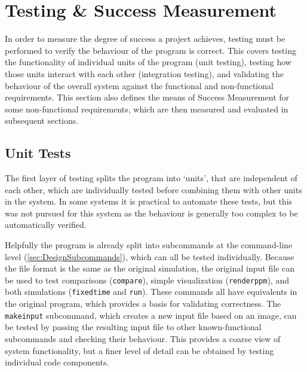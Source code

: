 \chapter{Testing \& Success Measurement}\label{sec:Testing}
In order to measure the degree of success a project achieves, testing must be performed to verify the behaviour of the program is correct.
This covers testing the functionality of individual units of the program (unit testing), testing how those units interact with each other (integration testing), and validating the behaviour of the overall system against the functional and non-functional requirements\cite{LevelsOfTesting}.
This section also defines the means of Success Measurement for some non-functional requirements, which are then measured and evaluated in subsequent sections.%

\section{Unit Tests}
The first layer of testing splits the program into `units', that are independent of each other, which are individually tested before combining them with other units in the system.
In some systems it is practical to automate these tests, but this was not pursued for this system as the behaviour is generally too complex to be automatically verified.

Helpfully the program is already split into subcommands at the command-line level (\cref{sec:DesignSubcommands}), which can all be tested individually.
Because the file format is the same as the original simulation, the original input file can be used to test comparisons (\texttt{compare}), simple visualization (\texttt{renderppm}), and both simulations (\texttt{fixedtime} and \texttt{run}).
These commands all have equivalents in the original program, which provides a basis for validating correctness.
The \texttt{makeinput} subcommand, which creates a new input file based on an image, can be tested by passing the resulting input file to other known-functional subcommands and checking their behaviour.
This provides a coarse view of system functionality, but a finer level of detail can be obtained by testing individual code components.

